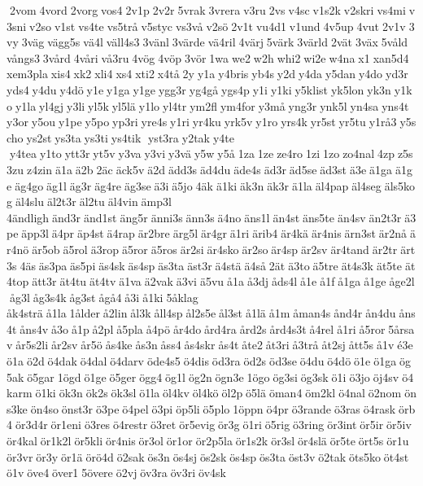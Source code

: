  2vom 4vord 2vorg vos4 2v1p 2v2r 5vrak 3vrera v3ru 2vs v4sc v1s2k v2skri vs4mi v3sni v2so v1st vs4te vs5trå v5styc vs3vå v2sö 2v1t vu4d1 v1und 4v5up 4vut 2v1v 3vy 3väg vägg5s vä4l väll4s3 3vänl 3värde vä4ril 4värj 5värk 3värld 2vät 3väx 5våld vångs3 3vård 4våri vå3ru 4vög 4vöp 3vör 1wa we2 w2h whi2 wi2e w4na x1 xan5d4 xem3pla xis4 xk2 xli4 xs4 xti2 x4tå 2y y1a y4bris yb4s y2d y4da y5dan y4do yd3r yds4 y4du y4dö y1e y1ga y1ge ygg3r yg4gå ygs4p y1i y1ki y5klist yk5lon yk3n y1ko y1la yl4gj y3li yl5k yl5lä y1lo yl4tr ym2fl ym4for y3må yng3r ynk5l yn4sa yns4t y3or y5ou y1pe y5po yp3ri yre4s y1ri yr4ku yrk5v y1ro yrs4k yr5st yr5tu y1rå3 y5scho ys2st ys3ta ys3ti ys4tik  yst3ra y2tak y4te  y4tea y1to ytt3r yt5v y3va y3vi y3vä y5w y5å 1za 1ze ze4ro 1zi 1zo zo4nal 4zp z5s 3zu z4zin ä1a ä2b 2äc äck5v ä2d ädd3s äd4du äde4s äd3r äd5se äd3st ä3e ä1ga ä1ge äg4go äg1l äg3r äg4re äg3se ä3i ä5jo 4äk ä1ki äk3n äk3r ä1la äl4pap äl4seg äls5kog äl4slu äl2t3r äl2tu äl4vin ämp3l 	4ändligh änd3r änd1st äng5r änni3s änn3s ä4no äns1l än4st äns5te än4sv än2t3r ä3pe äpp3l ä4pr äp4st ä4rap är2bre ärg5l är4gr ä1ri ärib4 är4kä är4nis ärn3st är2nå är4nö är5ob ä5rol ä3rop ä5ror ä5ros är2si är4sko är2so är4sp är2sv är4tand är2tr ärt3s 4äs äs3pa äs5pi äs4sk äs4sp äs3ta äst3r ä4stä ä4så 2ät ä3to ä5tre ät4s3k ät5te ät4top ätt3r ät4tu ät4tv ä1va ä2vak ä3vi ä5vu å1a å3dj åds4l å1e å1f å1ga å1ge åge2l åg3l åg3s4k åg3st ågå4 å3i å1ki 5åklag 	åk4strä å1la 1ålder å2lin ål3k åll4sp ål2s5e ål3st å1lä å1m åman4s ånd4r ån4du åns4t åns4v å3o å1p å2pl å5pla å4pö år4do ård4ra ård2s ård4s3t å4rel å1ri å5ror 5årsav år5s2li år2sv år5ö ås4ke ås3n åss4 ås4skr ås4t åte2 åt3ri å3trå åt2sj ått5s å1v é3e ö1a ö2d ö4dak ö4dal ö4darv öde4s5 ö4dis öd3ra öd2s öd3se ö4du ö4dö ö1e ö1ga ög5ak ö5gar 1ögd ö1ge ö5ger ögg4 ög1l ög2n ögn3e 1ögo ög3si ög3sk ö1i ö3jo öj4sv ö4karm ö1ki ök3n ök2s ök3sl ö1la öl4kv öl4kö öl2p ö5lä öman4 öm2kl ö4nal ö2nom öns3ke ön4so önst3r ö3pe ö4pel ö3pi öp5li ö5plo 1öppn ö4pr ö3rande ö3ras ö4rask örb4 ör3d4r ör1eni ö3res ö4restr ö3ret ör5evig ör3g ö1ri ö5rig ö3ring ör3int ör5ir ör5iv ör4kal ör1k2l ör5kli ör4nis ör3ol ör1or ör2p5la ör1s2k ör3sl ör4slä ör5te ört5s ör1u ör3vr ör3y ör1ä örö4d ö2sak ös3n ös4sj ös2sk ös4sp ös3ta öst3v ö2tak öts5ko öt4st ö1v öve4 över1 5övere ö2vj öv3ra öv3ri öv4sk